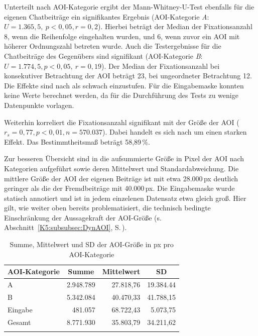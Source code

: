 \begin{sloppypar}
Unterteilt nach AOI-Kategorie ergibt der Mann-Whitney-U-Test ebenfalls für die eigenen Chatbeiträge ein signifikantes Ergebnis (AOI-Kategorie \emph{A}: $U = 1.365,5,\allowbreak\ p < 0,05, r = 0,2$). Hierbei beträgt der Median der Fixationsanzahl 8, wenn die Reihenfolge eingehalten wurden, und 6, wenn zuvor ein AOI mit höherer Ordnungszahl betreten wurde. Auch die Testergebnisse für die Chatbeiträge des Gegenübers sind signifikant (AOI-Kategorie \emph{B}: $U = 1.774,5, p < 0,05,\allowbreak\ r = 0,19$). Der Median der Fixationsanzahl bei konsekutiver Betrachtung der AOI beträgt 23, bei ungeordneter Betrachtung 12. Die Effekte sind nach \citet{cohen_power_1992} als schwach einzustufen. Für die Eingabemaske konnten keine Werte berechnet werden, da für die Durchführung des Tests zu wenige Datenpunkte vorlagen.
\end{sloppypar}

Weiterhin korreliert die Fixationsanzahl signifikant mit der Größe der AOI ($r_{s} = 0,77, p < 0,01, n = 570.037$). Dabei handelt es sich nach \citet{cohen_power_1992} um einen starken Effekt. Das Bestimmtheitsmaß beträgt 58,89\,\%.

Zur besseren Übersicht sind in  die aufsummierte Größe in Pixel der AOI nach Kategorien aufgeführt sowie deren Mittelwert und Standardabweichung. Die mittlere Größe der AOI der eigenen Beiträge ist mit etwa 28.000\,px deutlich geringer als die der Fremdbeiträge mit 40.000\,px. Die Eingabemaske wurde statisch annotiert und ist in jedem einzelenen Datensatz etwa gleich groß. Hier gilt, wie weiter oben bereits problematisiert, die technisch bedingte Einschränkung der Aussagekraft der AOI-Größe (s. Abschnitt~\ref{K5:subsubsec:DynAOI}, S.\,\pageref{K5:subsubsec:DynAOI}). 



	
\begin{table}
    \begin{tabular}{lrrr}  
    \lsptoprule
        {AOI-Kategorie} & \multicolumn{1}{c}{Summe} & \multicolumn{1}{c}{Mittelwert} & \multicolumn{1}{c}{SD} \\ 
        \midrule
        A & 2.948.789 & 27.818,76 & 19.384.44 \\ 
        B & 5.342.084 & 40.470,33 & 41.788,15 \\ 
        Eingabe & 481.057 & 68.722,43 & 5.073,75 \\ 
        \midrule
        Gesamt & 8.771.930 & 35.803,79 & 34.211,62 \\ 
        \lspbottomrule
    \end{tabular}
            \caption{Summe, Mittelwert und SD der AOI-Größe in px pro AOI-Kategorie\label{K6:tab:DeDe:mean-sd-iaarea}}
\end{table}

